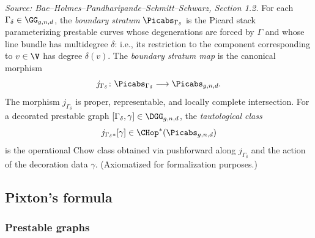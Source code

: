 \begin{definition}
  \label{def:boundary_map_j}
  \textit{Source: Bae--Holmes--Pandharipande--Schmitt--Schwarz, Section 1.2.}
  For each $\Gamma_\delta \in \GG_{g,n,d}$, the \emph{boundary stratum}
  $\Picabs_{\Gamma_\delta}$ is the Picard stack parameterizing prestable curves
  whose degenerations are forced by $\Gamma$ and whose line bundle has multidegree $\delta$:
  i.e., its restriction to the component corresponding to $v \in \V$ has degree $\delta(v)$.
  The \emph{boundary stratum map} is the canonical morphism
  \[
    j_{\Gamma_\delta}\colon \Picabs_{\Gamma_\delta} \longrightarrow \Picabs_{g,n,d}.
  \]
  The morphism $j_{\Gamma_\delta}$ is proper, representable, and locally complete intersection.
  For a decorated prestable graph $[\Gamma_\delta, \gamma] \in \DGG_{g,n,d}$, the
  \emph{tautological class}
  \[
    j_{\Gamma_\delta*}[\gamma] \in \CHop^*(\Picabs_{g,n,d})
  \]
  is the operational Chow class obtained via pushforward along $j_{\Gamma_\delta}$ and
  the action of the decoration data $\gamma$.
  (Axiomatized for formalization purposes.)
\end{definition}

\subsection{Pixton's formula}

\subsubsection{Prestable graphs}

